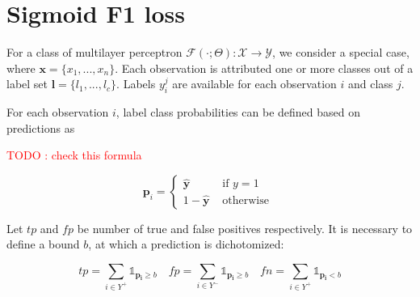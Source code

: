 \documentclass[sigconf,natbib,screen=true,review=true,anonymous]{acmart}
\newcommand\todo[1]{\textcolor{red}{TODO : #1}}
\begin{document}






\section{Sigmoid F1 loss}
\label{sec:org0a5d191}

For a class of multilayer perceptron \(\mathcal{F}(\cdot ; \Theta): \mathcal{X} \rightarrow \mathcal{Y}\), we consider a special case, where \(\mathbf{x} = \{x_1, ..., x_n\}\). Each observation is attributed one or more classes out of a label set \(\mathbf{l} = \{l_1, ..., l_c\}\). Labels \(y_{i}^{j}\) are available for each observation \(i\) and class \(j\). 

For each observation \(i\), label class probabilities can be defined based on predictions as

\todo{check this formula}

\begin{equation}
\mathbf{p}_{i}=\left\{\begin{array}{ll}\hat{\mathbf{y}} & \text { if } y=1 \\ 1-\hat{\mathbf{y}} & \text { otherwise }\end{array}\right.
\end{equation}

Let \(tp\) and \(fp\) be number of true and false positives respectively. It is necessary to define a bound \(b\), at which a prediction is dichotomized:

\begin{equation}
\label{eq:conf}
 t p=\sum_{i \in Y^{+}} \mathds{1}_{\mathbf{p_i} \geq b} \quad f p=\sum_{i \in Y^{-}} \mathds{1}_{\mathbf{p_i} \geq b} \quad fn = \sum_{i \in Y^{+}} \mathds{1}_{\mathbf{p_i} < b}
\end{equation}
\end{document}
